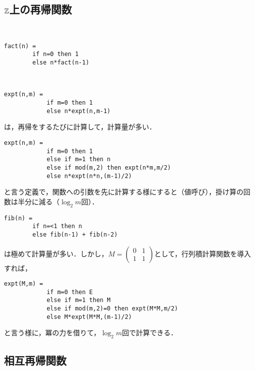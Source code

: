 \documentclass[uplatex, 12pt, dvipdfmx]{jsreport}
\begin{document}
\subsection{$\mathbb{Z}$上の再帰関数}

\begin{example}[階乗]　

\begin{lstlisting}[caption=factorial]
    fact(n) = 
        if n=0 then 1
        else n*fact(n-1)
\end{lstlisting}
\end{example}

\begin{example}[冪]　

    \begin{lstlisting}[caption=exponential]
        expt(n,m) = 
            if m=0 then 1
            else n*expt(n,m-1)
    \end{lstlisting}
    は，再帰をするたびに計算して，計算量が多い．
    \begin{lstlisting}[caption=exponential]
        expt(n,m) = 
            if m=0 then 1
            else if m=1 then n
            else if mod(m,2) then expt(n*m,m/2)
            else n*expt(n*n,(m-1)/2)
    \end{lstlisting}
    と言う定義で，関数への引数を先に計算する様にすると（値呼び），掛け算の回数は半分に減る（$\log_2m$回）．
\end{example}

\begin{example}
    
    \begin{lstlisting}[caption=fibonacci number]
    fib(n) = 
        if n=<1 then n
        else fib(n-1) + fib(n-2)
    \end{lstlisting}
    は極めて計算量が多い．しかし，$M=\begin{pmatrix}0&1\\1&1\end{pmatrix}$として，行列積計算関数を導入すれば，
    \begin{lstlisting}[caption=fibonacci number]
        expt(M,m) = 
            if m=0 then E
            else if m=1 then M
            else if mod(m,2)=0 then expt(M*M,m/2)
            else M*expt(M*M,(m-1)/2)
    \end{lstlisting}
    と言う様に，冪の力を借りて，$\log_2m$回で計算できる．
\end{example}

\subsection{相互再帰関数}
\end{document}
